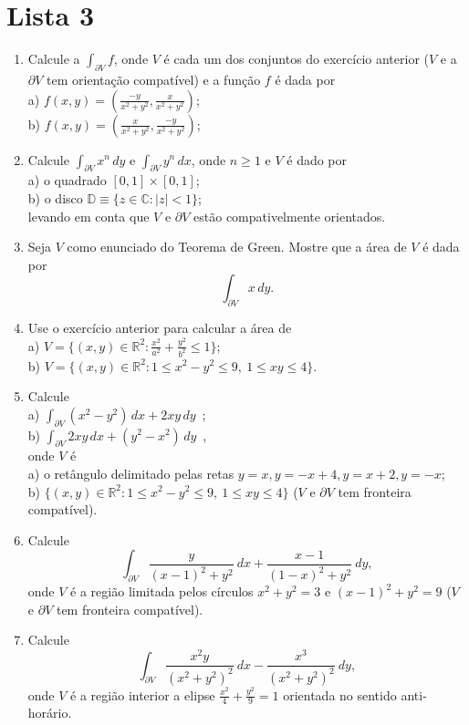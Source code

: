 \chapter*{Lista 3}



\begin{enumerate}[leftmargin=*]

	\item Calcule a $\int_{\partial V} f$, onde $V$ é cada um dos conjuntos do exercício anterior ($V$ e a $\partial V$ tem orientação compatível) e a função $f$ é dada por \\[0.2cm]
	a) $f(x,y)=\left(\displaystyle\frac{-y}{x^2+y^2},\frac{x}{x^2+y^2}\right)$;\\[0.3cm]
	b) $f(x,y)=\left(\displaystyle\frac{x}{x^2+y^2},\frac{-y}{x^2+y^2}\right)$;\\
	\item Calcule $\int_{\partial V}x^n\, dy$ e $\int_{\partial V}y^n\, dx$, onde $n\geq 1$ e $V$ é dado por \\
	a) o quadrado $[0,1]\times [0,1]$;\\
	b) o disco $\mathbb{D}\equiv \{z\in\mathbb{C}: |z|< 1\}$;\\ 
	levando em conta que $V$ e $\partial V$ estão compativelmente orientados.
	\item Seja $V$ como enunciado do Teorema de Green. Mostre que a área de $V$ é dada por 
	$$
	\int_{\partial V} x\, dy.
	$$
	\item Use o exercício anterior para calcular a área de\\
	a) $V=\{(x,y)\in\mathbb{R}^2: \frac{x^2}{a^2}+\frac{y^2}{b^2}\leq 1\}$;\\
	b) $V=\{(x,y)\in\mathbb{R}^2: 1\leq x^2-y^2\leq 9, \ 1\leq xy\leq 4\}$.
	\item Calcule 
	\\[0.2cm]
	a) $\displaystyle\int_{\partial V} (x^2-y^2)\, dx+ 2xy \, dy$\ ;\\[0.5cm]
	b) $\displaystyle \int_{\partial V} 2xy\, dx+ (y^2-x^2) \, dy$\ ,\\[0.5cm]
	onde $V$ é \\
	a) o retângulo delimitado pelas retas $y=x, y=-x+4, y=x+2, y=-x$;\\
	b) $\{(x,y)\in\mathbb{R}^2: 1\leq x^2-y^2\leq 9, \ 1\leq xy\leq 4\}$ ($V$ e $\partial V$ tem fronteira compatível). 
	\item Calcule 
	$$
	\int_{\partial V} \frac{y}{(x-1)^2+y^2}\ dx + \frac{x-1}{(1-x)^2+y^2}\ dy,
	$$
	onde $V$ é a região limitada pelos círculos $x^2+y^2=3$ e $(x-1)^2+y^2=9$ ($V$ e $\partial V$ tem fronteira compatível). 
	\item Calcule 
	$$
	\int_{\partial V} \frac{x^2y}{(x^2+y^2)^2}\ dx - \frac{x^3}{(x^2+y^2)^2}\ dy,
	$$
	onde $V$ é a região interior a elipse $\frac{x^2}{4}+\frac{y^2}{9}=1$ orientada no sentido anti-horário. 




\end{enumerate}
